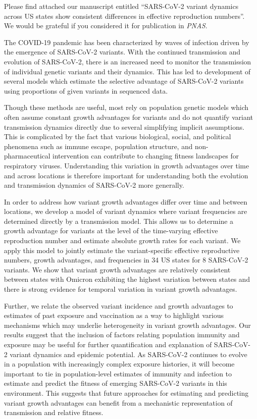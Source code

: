 \documentclass[stdletter,letterpaper,addrfromright,orderfromdateto,dateleft,11pt,noaddrto,sigleft]{newlfm}
\begin{document}
\begin{newlfm}

   Please find attached our manuscript entitled ``SARS-CoV-2 variant dynamics across US states show consistent differences in effective reproduction numbers''.
   We would be grateful if you considered it for publication in \textit{PNAS}.

   The COVID-19 pandemic has been characterized by waves of infection driven by the emergence of SARS-CoV-2 variants. 
   With the continued transmission and evolution of SARS-CoV-2, there is an increased need to monitor the transmission of individual genetic variants and their dynamics.
   This has led to development of several models which estimate the selective advantage of SARS-CoV-2 variants using proportions of given variants in sequenced data.

   Though these methods are useful, most rely on population genetic models which often assume constant growth advantages for variants and do not quantify variant transmission dynamics directly due to several simplifying implicit assumptions.
   This is complicated by the fact that various biological, social, and political phenomena such as immune escape, population structure, and non-pharmaceutical intervention can contribute to changing fitness landscapes for respiratory viruses.
   Understanding this variation in growth advantages over time and across locations is therefore important for understanding both the evolution and transmission dynamics of SARS-CoV-2 more generally.

   In order to address how variant growth advantages differ over time and between locations, we develop a model of variant dynamics where variant frequencies are determined directly by a transmission model.
   This allows us to determine a growth advantage for variants at the level of the time-varying effective reproduction number and estimate absolute growth rates for each variant.
   We apply this model to jointly estimate the variant-specific effective reproductive numbers, growth advantages, and frequencies in 34 US states for 8 SARS-CoV-2 variants.
   We show that variant growth advantages are relatively consistent between states with Omicron exhibiting the highest variation between states and there is strong evidence for temporal variation in variant growth advantages.

   Further, we relate the observed variant incidence and growth advantages to estimates of past exposure and vaccination as a way to highlight various mechanisms which may underlie heterogeneity in variant growth advantages.
   Our results suggest that the inclusion of factors relating population immunity and exposure may be useful for further quantification and explanation of SARS-CoV-2 variant dynamics and epidemic potential.
   As SARS-CoV-2 continues to evolve in a population with increasingly complex exposure histories, it will become important to tie in population-level estimates of immunity and infection to estimate and predict the fitness of emerging SARS-CoV-2 variants in this environment.
   This suggests that future approaches for estimating and predicting variant growth advantages can benefit from a mechanistic representation of transmission and relative fitness.


\end{newlfm}
\end{document}
